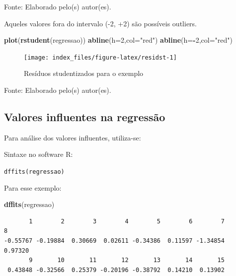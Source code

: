 \documentclass[12pt,brazil,oneside]{book}
\newenvironment{Shaded}{\begin{snugshade}}{\end{snugshade}}
\newcommand{\DataTypeTok}[1]{\textcolor[rgb]{0.13,0.29,0.53}{#1}}
\newcommand{\DecValTok}[1]{\textcolor[rgb]{0.00,0.00,0.81}{#1}}
\newcommand{\KeywordTok}[1]{\textcolor[rgb]{0.13,0.29,0.53}{\textbf{#1}}}
\newcommand{\NormalTok}[1]{#1}
\newcommand{\OperatorTok}[1]{\textcolor[rgb]{0.81,0.36,0.00}{\textbf{#1}}}
\newcommand{\StringTok}[1]{\textcolor[rgb]{0.31,0.60,0.02}{#1}}
\begin{document}
Fonte: Elaborado pelo(s) autor(es).

Aqueles valores fora do intervalo (-2, +2) são possíveis outliers.

\begin{Shaded}
\begin{Highlighting}[]
\KeywordTok{plot}\NormalTok{(}\KeywordTok{rstudent}\NormalTok{(regressao)) }
\KeywordTok{abline}\NormalTok{(}\DataTypeTok{h=}\DecValTok{2}\NormalTok{,}\DataTypeTok{col=}\StringTok{"red"}\NormalTok{)}
\KeywordTok{abline}\NormalTok{(}\DataTypeTok{h=}\OperatorTok{-}\DecValTok{2}\NormalTok{,}\DataTypeTok{col=}\StringTok{"red"}\NormalTok{)}
\end{Highlighting}
\end{Shaded}

\begin{figure}[H]

{\centering \texttt{[image: index\_files/figure-latex/residst-1]} 

}

\caption{Resíduos studentizados para o exemplo}\label{fig:residst}
\end{figure}

Fonte: Elaborado pelo(s) autor(es).

\hypertarget{valores-influentes-na-regressao}{%
\subsection{Valores influentes na regressão}\label{valores-influentes-na-regressao}}

Para análise dos valores influentes, utiliza-se:

Sintaxe no software R:

\texttt{dffits(regressao)}

Para esse exemplo:

\begin{Shaded}
\begin{Highlighting}[]
\KeywordTok{dffits}\NormalTok{(regressao)}
\end{Highlighting}
\end{Shaded}

\begin{verbatim}
       1        2        3        4        5        6        7        8 
-0.55767 -0.19884  0.30669  0.02611 -0.34386  0.11597 -1.34854  0.97320 
       9       10       11       12       13       14       15 
 0.43848 -0.32566  0.25379 -0.20196 -0.38792  0.14210  0.13902 
\end{verbatim}
\end{document}
